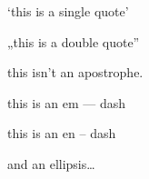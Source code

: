 
\def\mytitle{MultiMarkdown Dutch Test}

`this is a single quote'

„this is a double quote''

this isn't an apostrophe.

this is an em --- dash

this is an en -- dash

and an ellipsis{\ldots}




